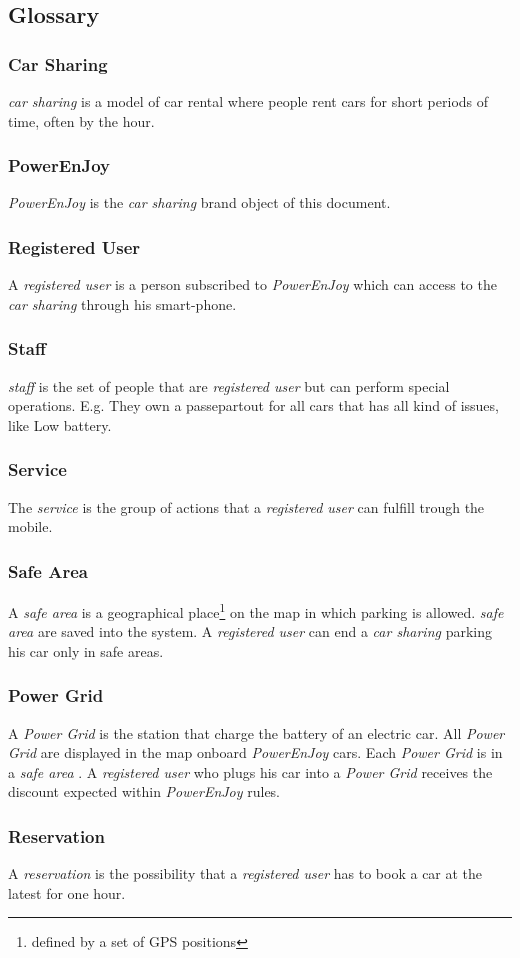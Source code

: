 \documentclass[english]{article}
\newcommand{\carsharing}{\textit {car sharing }}
\newcommand{\powerenjoy}{\textit{PowerEnJoy }}
\newcommand{\registereduser}{\textit {registered user }}
\newcommand{\staff}{\textit{staff }}
\newcommand{\service}{\textit{service }}
\newcommand{\safearea}{\textit{safe area }}
\newcommand{\powergrid}{\textit{Power Grid }}
\newcommand{\resevation}{\textit{reservation }}
\begin{document}
	\subsection{Glossary}
		\subsubsection{Car Sharing}
			\carsharing is a model of car rental where people rent cars for short periods of time, often by the hour.
		\subsubsection{PowerEnJoy}
			\powerenjoy is the \carsharing brand object of this document. 
		\subsubsection{Registered User}
			A \registereduser is a person subscribed to \powerenjoy which can access to the \carsharing through his smart-phone.
		\subsubsection{Staff}
			\staff is the set of people that are \registereduser but can perform special operations. E.g. They own a passepartout for all cars that has all kind of issues, like Low battery.
		\subsubsection{Service}
			The \service is the group of actions that a \registereduser can fulfill trough the mobile.	
		\subsubsection {Safe Area}
			A \safearea is a  geographical place\footnote{defined by a set of GPS positions} on the map in which parking is allowed. \safearea are saved into the system. A \registereduser can end a \carsharing parking his car only in safe areas.
	\subsubsection{Power Grid}
		A \powergrid is the station that charge the battery of an electric car. All \powergrid are displayed in the map onboard \powerenjoy cars. Each \powergrid is in a \safearea. A \registereduser who plugs his car into a \powergrid receives the discount expected within \powerenjoy rules.
	\subsubsection{Reservation}
		A \resevation is the possibility that a \registereduser has to book a car at the latest for one hour.
\end{document}
